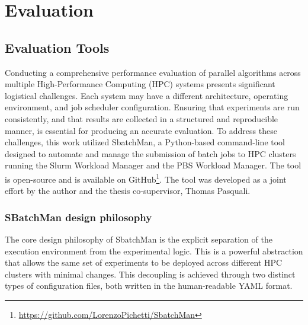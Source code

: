 \chapter{Evaluation}
\label{cha:results}

\section{Evaluation Tools}
Conducting a comprehensive performance evaluation of parallel algorithms across multiple High-Performance Computing (HPC) systems presents significant logistical challenges. Each system may have a different architecture, operating environment, and job scheduler configuration. Ensuring that experiments are run consistently, and that results are collected in a structured and reproducible manner, is essential for producing an accurate evaluation. To address these challenges, this work utilized SbatchMan, a Python-based command-line tool designed to automate and manage the submission of batch jobs to HPC clusters running the Slurm Workload Manager and the PBS Workload Manager. The tool is open-source and is available on GitHub\footnote{\url{https://github.com/LorenzoPichetti/SbatchMan}}. The tool was developed as a joint effort by the author and the thesis co-supervisor, Thomas Pasquali.

\subsection{SBatchMan design philosophy}

The core design philosophy of SbatchMan is the explicit separation of the execution environment from the experimental logic. This is a powerful abstraction that allows the same set of experiments to be deployed across different HPC clusters with minimal changes. This decoupling is achieved through two distinct types of configuration files, both written in the human-readable YAML format.

